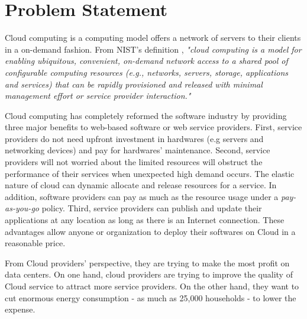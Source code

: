 \section{Problem Statement}

Cloud computing is a computing model offers a network of servers to their 
clients in a on-demand fashion. From NIST's definition \cite{Mell:2011jj}, \textit{"cloud computing is a model for enabling ubiquitous, convenient, on-demand network access to a shared pool of configurable computing resources (e.g., networks, servers, storage, applications and services) that can be rapidly provisioned and released with minimal management effort or service provider interaction."}

Cloud computing has completely reformed the software industry \cite{Buyya:2009ix} by providing three major benefits to web-based software or web service providers.
First, service providers do not need upfront investment in hardwares (e.g servers and networking devices) and pay for hardwares' maintenance. 
Second, service providers will not worried about the limited resources will obstruct the performance of their services when unexpected high demand occurs. The elastic nature of cloud can dynamic allocate and release resources for a service. In addition, software providers can pay as much as the resource usage under a \emph{pay-as-you-go} policy.
Third, service providers can publish and update their applications at any location 
as long as there is an Internet connection. 
These advantages allow anyone or organization to deploy their softwares on Cloud in
a reasonable price. 

From Cloud providers' perspective, they are trying to make the most profit on data centers.
On one hand, cloud providers are trying to improve the quality of  Cloud service to attract more service providers.  
On the other hand, they want to cut enormous energy consumption 
- as much as 25,000 households \cite{Kaplan:up01fR-k} - to lower the expense.  

